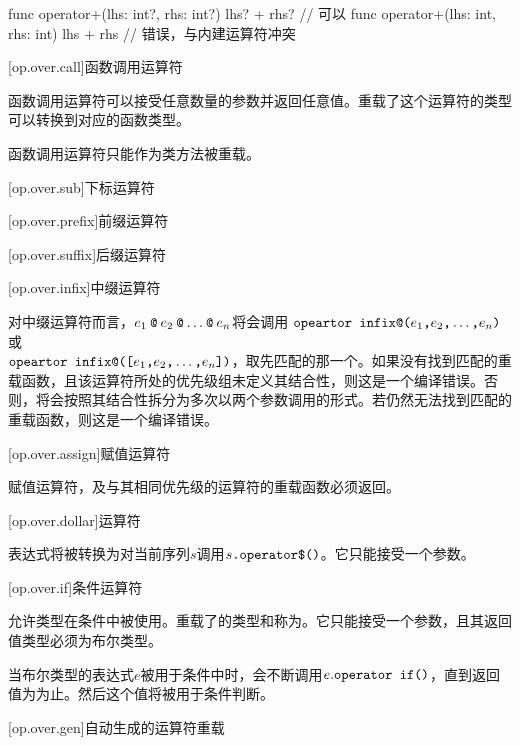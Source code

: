 \enterexample
\begin{codeblock}
func operator+(lhs: int?, rhs: int?) { lhs? + rhs? } // 可以
func operator+(lhs: int, rhs: int) { lhs + rhs } // 错误，与内建运算符冲突
\end{codeblock}
\exitexample

[op.over.call]{函数调用运算符}

\pnum
函数调用运算符可以接受任意数量的参数并返回任意值。重载了这个运算符的类型可以转换到对应的函数类型。

\pnum
函数调用运算符只能作为类方法被重载。

[op.over.sub]{下标运算符}

[op.over.prefix]{前缀运算符}

[op.over.suffix]{后缀运算符}

[op.over.infix]{中缀运算符}

\pnum
对中缀运算符而言，$e_1\mathbin{\texttt{@}}e_2\mathbin{\texttt{@}}\ldots\mathbin{\texttt{@}}e_n$将会调用
$\texttt{opeartor infix@(}e_1\texttt{,}e_2\texttt{,}\ldots\texttt{,}e_n\texttt{)}$或\\$\texttt{opeartor infix@([}e_1\texttt{,}e_2\texttt{,}\ldots\texttt{,}e_n\texttt{])}$，取先匹配的那一个。如果没有找到匹配的重载函数，且该运算符所处的优先级组未定义其结合性，则这是一个编译错误。否则，将会按照其结合性拆分为多次以两个参数调用的形式。若仍然无法找到匹配的重载函数，则这是一个编译错误。

[op.over.assign]{赋值运算符}

\pnum
赋值运算符，及与其相同优先级的运算符的重载函数必须返回。

[op.over.dollar]{\tcode{\$}运算符}

\pnum
\tcode{\$}表达式将被转换为对当前序列$s$调用$s\texttt{.operator\$()}$。它只能接受一个参数。

[op.over.if]{条件运算符}

\pnum
{}允许类型在条件中被使用。重载了的类型和称为。它只能接受一个参数，且其返回值类型必须为布尔类型。

\pnum
当布尔类型的表达式$e$被用于条件中时，会不断调用$e.\texttt{operator if()}$，直到返回值为为止。然后这个值将被用于条件判断。

[op.over.gen]{自动生成的运算符重载}

